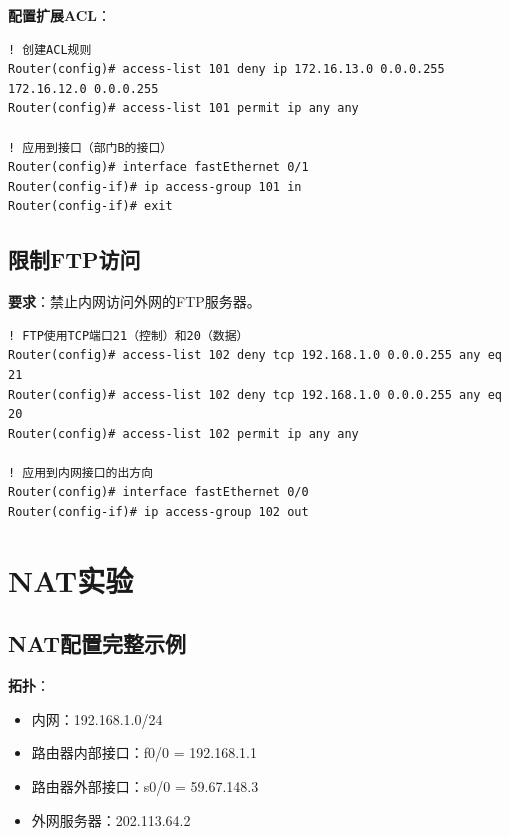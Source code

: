 \documentclass[12pt,a4paper]{ctexart}
\begin{document}
\begin{cmdbox}
\textbf{配置扩展ACL}：
\begin{lstlisting}
! 创建ACL规则
Router(config)# access-list 101 deny ip 172.16.13.0 0.0.0.255 172.16.12.0 0.0.0.255
Router(config)# access-list 101 permit ip any any

! 应用到接口（部门B的接口）
Router(config)# interface fastEthernet 0/1
Router(config-if)# ip access-group 101 in
Router(config-if)# exit
\end{lstlisting}
\end{cmdbox}

\subsection{限制FTP访问}

\begin{exambox}[限制FTP访问]
\textbf{要求}：禁止内网访问外网的FTP服务器。
\end{exambox}

\begin{cmdbox}
\begin{lstlisting}
! FTP使用TCP端口21（控制）和20（数据）
Router(config)# access-list 102 deny tcp 192.168.1.0 0.0.0.255 any eq 21
Router(config)# access-list 102 deny tcp 192.168.1.0 0.0.0.255 any eq 20
Router(config)# access-list 102 permit ip any any

! 应用到内网接口的出方向
Router(config)# interface fastEthernet 0/0
Router(config-if)# ip access-group 102 out
\end{lstlisting}
\end{cmdbox}

\section{NAT实验}

\subsection{NAT配置完整示例}

\begin{exambox}[NAT实验]
\textbf{拓扑}：
\begin{itemize}[itemsep=0pt]
    \item 内网：192.168.1.0/24
    \item 路由器内部接口：f0/0 = 192.168.1.1
    \item 路由器外部接口：s0/0 = 59.67.148.3
    \item 外网服务器：202.113.64.2
\end{itemize}
\end{exambox}
\end{document}
